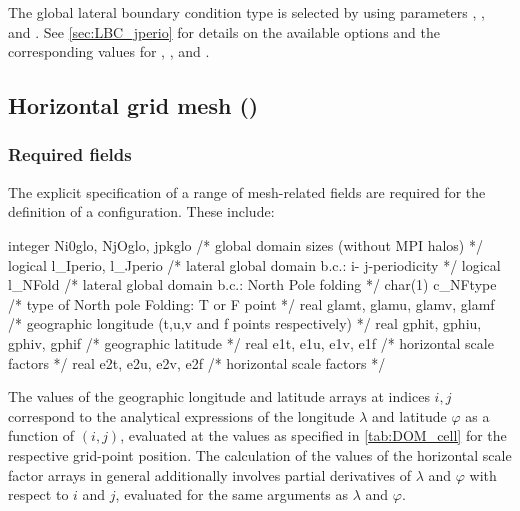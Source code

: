 \documentclass[../main/NEMO_manual]{subfiles}
\begin{document}
The global lateral boundary condition type is selected by using parameters , ,  and .
See \autoref{sec:LBC_jperio} for details on the available options and
the corresponding values for , ,  and .

\subsection[Horizontal grid mesh (\textit{domhgr.F90}]{Horizontal grid mesh (\protect{})}
\label{subsec:DOM_hgr}

\subsubsection{Required fields}
\label{sec:DOM_hgr_fields}

The explicit specification of a range of mesh-related fields are required for
the definition of a configuration.
These include:

\begin{forlines}
integer   Ni0glo, NjOglo, jpkglo       /* global domain sizes (without MPI halos)                */
logical   l_Iperio, l_Jperio           /* lateral global domain b.c.: i- j-periodicity           */
logical   l_NFold                      /* lateral global domain b.c.: North Pole folding         */
char(1)   c_NFtype                     /*    type of North pole Folding: T or F point            */
real      glamt, glamu, glamv, glamf   /* geographic longitude (t,u,v and f points respectively) */
real      gphit, gphiu, gphiv, gphif   /* geographic latitude                                    */
real      e1t, e1u, e1v, e1f           /* horizontal scale factors                               */
real      e2t, e2u, e2v, e2f           /* horizontal scale factors                               */
\end{forlines}

The values of the geographic longitude and latitude arrays at indices $i,j$ correspond to
the analytical expressions of the longitude $\lambda$ and latitude $\varphi$ as a function of $(i,j)$,
evaluated at the values as specified in \autoref{tab:DOM_cell} for the respective grid-point position.
The calculation of the values of the horizontal scale factor arrays in general additionally involves
partial derivatives of $\lambda$ and $\varphi$ with respect to $i$ and $j$,
evaluated for the same arguments as $\lambda$ and $\varphi$.
\end{document}
